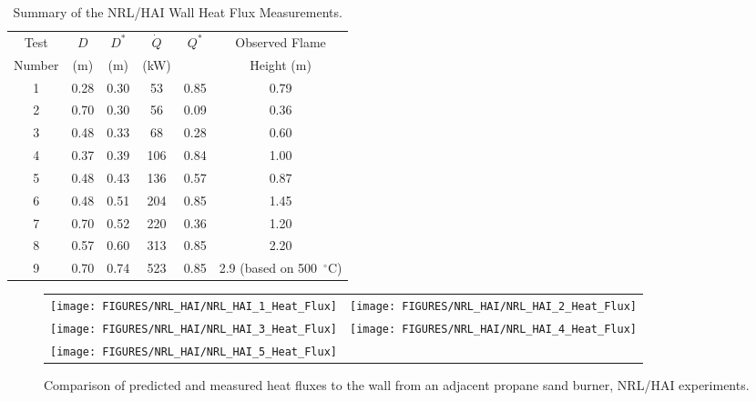 \begin{table}[ht]
\caption{Summary of the NRL/HAI Wall Heat Flux Measurements. }
\begin{center}
\begin{tabular}{|c|c|c|c|c|c|}
\hline
Test     & $D$     & $D^*$      & $\dot{Q}$   & $Q^*$   & Observed  Flame \\
Number   & (m)     & (m)        & (kW)        &         & Height (m)      \\ \hline \hline
1        & 0.28    & 0.30       &  53         & 0.85    & 0.79            \\ \hline
2        & 0.70    & 0.30       &  56         & 0.09    & 0.36            \\ \hline
3        & 0.48    & 0.33       &  68         & 0.28    & 0.60            \\ \hline
4        & 0.37    & 0.39       &  106        & 0.84    & 1.00            \\ \hline
5        & 0.48    & 0.43       &  136        & 0.57    & 0.87            \\ \hline
6        & 0.48    & 0.51       &  204        & 0.85    & 1.45            \\ \hline
7        & 0.70    & 0.52       &  220        & 0.36    & 1.20            \\ \hline
8        & 0.57    & 0.60       &  313        & 0.85    & 2.20            \\ \hline
9        & 0.70    & 0.74       &  523        & 0.85    & 2.9 (based on 500~$^\circ$C)       \\ \hline
\end{tabular}
\end{center}
\label{NRL/HAI_Parameters}
\end{table}

\begin{figure}[p]
\begin{tabular*}{\textwidth}{l@{\extracolsep{\fill}}r}
\texttt{[image: FIGURES/NRL\_HAI/NRL\_HAI\_1\_Heat\_Flux]} &
\texttt{[image: FIGURES/NRL\_HAI/NRL\_HAI\_2\_Heat\_Flux]} \\
\texttt{[image: FIGURES/NRL\_HAI/NRL\_HAI\_3\_Heat\_Flux]} &
\texttt{[image: FIGURES/NRL\_HAI/NRL\_HAI\_4\_Heat\_Flux]} \\
\texttt{[image: FIGURES/NRL\_HAI/NRL\_HAI\_5\_Heat\_Flux]} &
\end{tabular*}
\label{NRL_HAI_1}
\caption[Wall heat flux predictions, NRL/HAI experiments.]
{Comparison of predicted and measured heat fluxes to the wall from an adjacent propane sand burner, NRL/HAI experiments.}
\end{figure}


